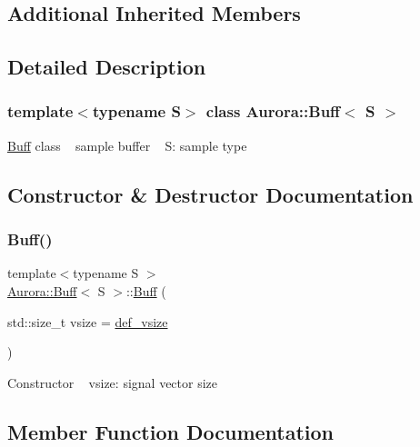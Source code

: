 \subsection*{Additional Inherited Members}


\subsection{Detailed Description}
\subsubsection*{template$<$typename S$>$\newline
class Aurora\+::\+Buff$<$ S $>$}

\hyperlink{class_aurora_1_1_buff}{Buff} class ~\newline
sample buffer ~\newline
S\+: sample type 

\subsection{Constructor \& Destructor Documentation}
\mbox{\label{class_aurora_1_1_buff_aa6a1980c02f6f9e416bbc59905e847ad}} 
\subsubsection{\texorpdfstring{Buff()}{Buff()}}
{\footnotesize\ttfamily template$<$typename S $>$ \\
\hyperlink{class_aurora_1_1_buff}{Aurora\+::\+Buff}$<$ S $>$\+::\hyperlink{class_aurora_1_1_buff}{Buff} (\begin{DoxyParamCaption}\item[{std\+::size\+\_\+t}]{vsize = {\ttfamily \hyperlink{namespace_aurora_afaaddf667a06e7ce23c667a8b7295263}{def\+\_\+vsize}} }\end{DoxyParamCaption})\hspace{0.3cm}{\ttfamily [inline]}}

Constructor ~\newline
vsize\+: signal vector size 

\subsection{Member Function Documentation}
\mbox{\label{class_aurora_1_1_buff_afd7878cb1948f8d41dfd635c163d1c27}} 
